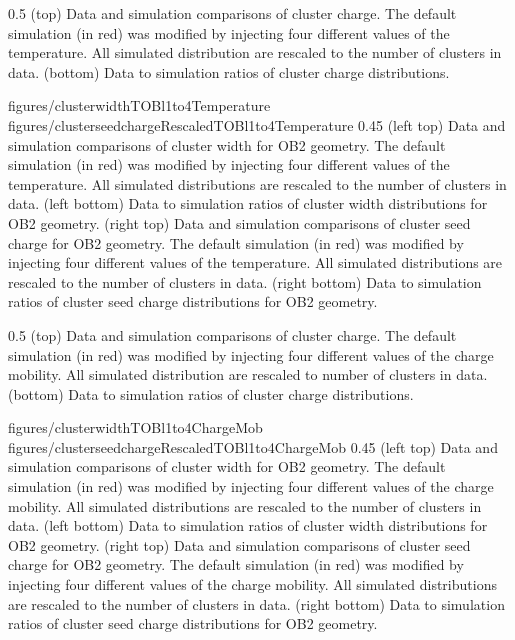                  {0.5}       %
                 { (top) Data and simulation comparisons of cluster charge. The default simulation (in red) was modified by injecting four different values of the temperature. All simulated distribution are rescaled to the number of clusters in data. (bottom) Data to simulation ratios of cluster charge distributions. }

                 {figures/clusterwidthTOBl1to4Temperature}
                 {figures/clusterseedchargeRescaledTOBl1to4Temperature} %
                 {0.45}       %
                 {(left top) Data and simulation  comparisons of cluster width for OB2 geometry. The default simulation (in red) was modified by injecting four different values of the temperature. All simulated distributions are rescaled to the number of clusters in data. (left bottom) Data to simulation ratios of cluster width distributions for OB2 geometry. (right top) Data and simulation  comparisons of cluster seed charge for OB2 geometry. The default simulation (in red) was modified by injecting four different values of the temperature. All simulated distributions are rescaled to the number of clusters in data. (right bottom) Data to simulation ratios of cluster seed charge distributions for OB2 geometry. }

                 {0.5}       %
                 { (top) Data and simulation comparisons of cluster charge. The default simulation (in red) was modified by injecting four different values of the charge mobility. All simulated distribution are rescaled to number of clusters in data. (bottom) Data to simulation ratios of cluster charge distributions. }

                 {figures/clusterwidthTOBl1to4ChargeMob}
                 {figures/clusterseedchargeRescaledTOBl1to4ChargeMob} %
                 {0.45}       %
                 {(left top) Data and simulation  comparisons of cluster width for OB2 geometry. The default simulation (in red) was modified by injecting four different values of the charge mobility. All simulated distributions are rescaled to the number of clusters in data. (left bottom) Data to simulation ratios of cluster width distributions for OB2 geometry. (right top) Data and simulation  comparisons of cluster seed charge for OB2 geometry. The default simulation (in red) was modified by injecting four different values of the charge mobility. All simulated distributions are rescaled to the number of clusters in data. (right bottom) Data to simulation ratios of cluster seed charge distributions for OB2 geometry. }

